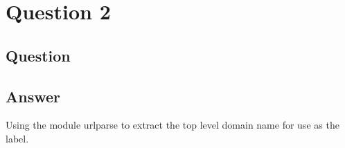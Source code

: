 \section{Question 2}

\subsection{Question}


\subsection{Answer}
Using the module urlparse\cite{py:urlparse} to extract the top level domain name for use as the label.